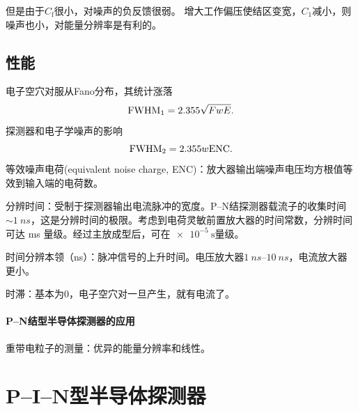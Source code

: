 但是由于$C_{\mathrm{f}}$很小，对噪声的负反馈很弱。%
增大工作偏压使结区变宽，$C_1$减小，则噪声也小，对能量分辨率是有利的。

\subsection{性能}

电子空穴对服从Fano分布，其统计涨落
\begin{equation}\label{eq:nrd-fano-linewidth}
	\mathrm{FWHM}_1 = 2.355\sqrt{FwE}.
\end{equation}
探测器和电子学噪声的影响
\begin{equation}\label{eq:nrd-noise-linewidth}
	\mathrm{FWHM}_2 = 2.355w\mathrm{ENC}.
\end{equation}
等效噪声电荷(equivalent noise charge, ENC)：放大器输出端噪声电压均方根值等效到输入端的电荷数。

\begin{compactitem}
	\item 分辨时间：受制于探测器输出电流脉冲的宽度。P--N结探测器载流子的收集时间$\sim \qty{1}{ns}$，这是分辨时间的极限。考虑到电荷灵敏前置放大器的时间常数，分辨时间可达 \unit{ms} 量级。经过主放成型后，可在$\qty{e-5}{\second}$量级。
	\item 时间分辨本领（\unit{ns}）：脉冲信号的上升时间。电压放大器$\qtyrange{1}{10}{ns}$，电流放大器更小。
	\item 时滞：基本为0，电子空穴对一旦产生，就有电流了。
\end{compactitem}

\paragraph{P--N结型半导体探测器的应用}
重带电粒子的测量：优异的能量分辨率和线性。

\section{P--I--N型半导体探测器}

